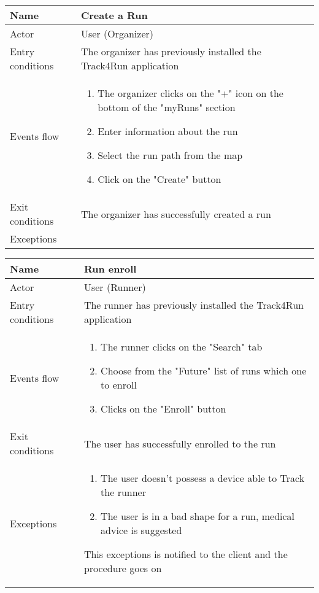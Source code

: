 \begin{table}[h!]
\begin{tabular}{|l|p{12cm}|}
\hline
Name             & Create a Run \\ \hline
Actor            & User (Organizer) \\ \hline
Entry conditions & The organizer has previously installed the Track4Run application \\ \hline
Events flow      & \begin{enumerate}
\item The organizer clicks on the "+" icon on the bottom of the "myRuns" section
\item Enter information about the run
\item Select the run path from the map
\item Click on the "Create" button
\end{enumerate} \\ \hline
Exit conditions  & The organizer has successfully created a run \\ \hline
Exceptions       & \\ \hline
\end{tabular}
\end{table}

\newpage
\begin{table}[]
\begin{tabular}{|l|p{12cm}|}
\hline
Name             & Run enroll \\ \hline
Actor            & User (Runner)\\ \hline
Entry conditions & The runner has previously installed the Track4Run application \\ \hline
Events flow      & \begin{enumerate}
\item The runner clicks on the "Search" tab 
\item Choose from the "Future" list of runs which one to enroll
\item Clicks on the "Enroll" button
\end{enumerate} \\ \hline
Exit conditions  & The user has successfully enrolled to the run \\ \hline
Exceptions       & \begin{enumerate}
\item The user doesn't possess a device able to Track the runner
\item The user is in a bad shape for a run, medical advice is suggested
\end{enumerate} This exceptions is notified to the client and the procedure goes on\\ \hline
\end{tabular}
\end{table}

